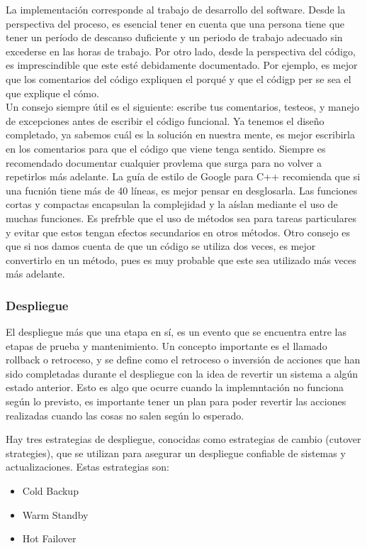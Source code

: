 La implementación corresponde al trabajo de desarrollo del software. Desde la perspectiva del proceso, es esencial tener en cuenta que una persona tiene que tener un período de descanso duficiente y un periodo de trabajo adecuado sin excederse en las horas de trabajo. Por otro lado, desde la perspectiva del código, es imprescindible que este esté debidamente documentado. Por ejemplo, es mejor que los comentarios del código expliquen el porqué y que el códigp per se sea el que explique el cómo. \\
Un consejo siempre útil es el siguiente: escribe tus comentarios, testeos, y manejo de excepciones antes de escribir el código funcional. Ya tenemos el diseño completado, ya sabemos cuál es la solución en nuestra mente, es mejor escribirla en los comentarios para que el código que viene tenga sentido. Siempre es recomendado documentar cualquier provlema que surga para no volver a repetirlos más adelante. La guía de estilo de Google para C++ recomienda que si una fucnión tiene más de 40 líneas, es mejor pensar en desglosarla. Las funciones cortas y compactas encapsulan la complejidad y la aíslan mediante el uso de muchas funciones. Es prefrble que el uso de métodos sea para tareas particulares y evitar que estos tengan efectos secundarios en otros métodos. Otro consejo es que si nos damos cuenta de que un código se utiliza dos veces, es mejor convertirlo en un método, pues es muy probable que este sea utilizado más veces más adelante.

\subsubsection{Despliegue} El despliegue más que una etapa en sí, es un evento que se encuentra entre las etapas de prueba y mantenimiento. Un concepto importante es el llamado rollback o retroceso, y se define como el retroceso o inversión de acciones que han sido completadas durante el despliegue con la idea de revertir un sistema a algún estado anterior. Esto es algo que ocurre cuando la implemntación no funciona según lo previsto, es importante tener un plan para poder revertir las acciones realizadas cuando las cosas no salen según lo esperado. 

Hay tres estrategias de despliegue, conocidas como estrategias de cambio (cutover strategies), que se utilizan para asegurar un despliegue confiable de sistemas y actualizaciones. Estas estrategias son: 

\begin{itemize}
    \item Cold Backup
    \item Warm Standby
    \item Hot Failover
\end{itemize}


